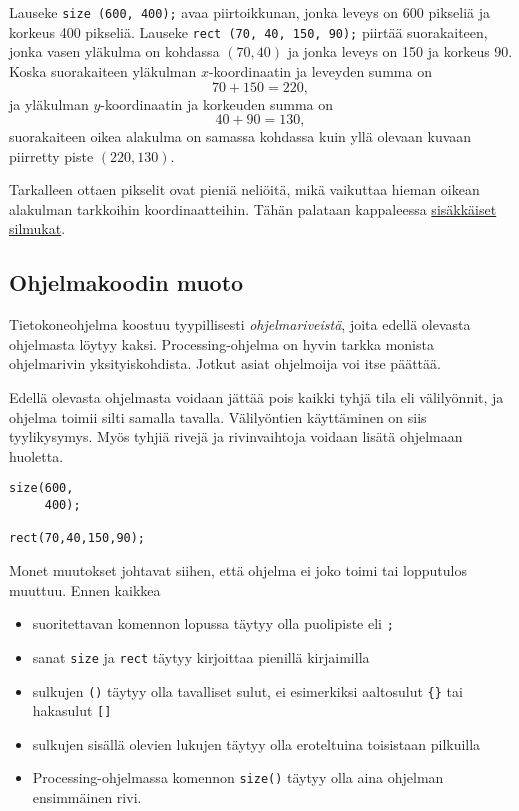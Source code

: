 \documentclass[11pt]{article}
\begin{document}
Lauseke \texttt{size (600, 400);} avaa piirtoikkunan, jonka leveys on 600
pikseliä ja korkeus 400 pikseliä. Lauseke \texttt{rect (70, 40, 150, 90);}
piirtää suorakaiteen, jonka vasen yläkulma on kohdassa \((70, 40)\)
ja jonka leveys on 150 ja korkeus 90. Koska suorakaiteen yläkulman
\(x\)-koordinaatin ja leveyden summa on \[ 70 + 150 = 220, \] ja
yläkulman \(y\)-koordinaatin ja korkeuden summa on \[ 40 + 90 =
   130, \] suorakaiteen oikea alakulma on samassa kohdassa kuin yllä
olevaan kuvaan piirretty piste \((220, 130)\).

Tarkalleen ottaen pikselit ovat pieniä neliöitä, mikä vaikuttaa
hieman oikean alakulman tarkkoihin koordinaatteihin. Tähän palataan
kappaleessa \href{sisakkaiset-silmukat.org}{sisäkkäiset silmukat}.
\subsection*{Ohjelmakoodin muoto}
\label{sec:org8eda858}
Tietokoneohjelma koostuu tyypillisesti \emph{ohjelmariveistä}, joita
edellä olevasta ohjelmasta löytyy kaksi. Processing-ohjelma on
hyvin tarkka monista ohjelmarivin yksityiskohdista. Jotkut asiat
ohjelmoija voi itse päättää.

Edellä olevasta ohjelmasta voidaan jättää pois kaikki tyhjä tila
eli välilyönnit, ja ohjelma toimii silti samalla
tavalla. Välilyöntien käyttäminen on siis tyylikysymys. Myös tyhjiä
rivejä ja rivinvaihtoja voidaan lisätä ohjelmaan huoletta.

\begin{verbatim}
size(600,
     400);

rect(70,40,150,90);
\end{verbatim}

Monet muutokset johtavat siihen, että ohjelma ei joko toimi tai
lopputulos muuttuu. Ennen kaikkea
\begin{itemize}
\item suoritettavan komennon lopussa täytyy olla puolipiste eli \texttt{;}
\item sanat \texttt{size} ja \texttt{rect} täytyy kirjoittaa pienillä kirjaimilla
\item sulkujen \texttt{()} täytyy olla tavalliset sulut, ei esimerkiksi
aaltosulut \texttt{\{\}} tai hakasulut \texttt{[]}
\item sulkujen sisällä olevien lukujen täytyy olla eroteltuina
toisistaan pilkuilla
\item Processing-ohjelmassa komennon \texttt{size()} täytyy olla aina ohjelman
ensimmäinen rivi.
\end{itemize}
\end{document}
